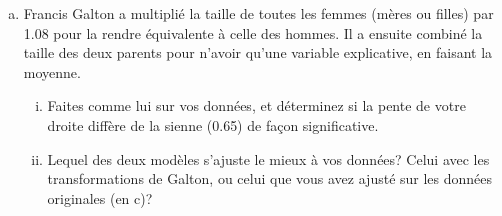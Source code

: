 \documentclass[letter, 11pt]{article}
\begin{document}
\begin{enumerate}[(a)]
\item Francis Galton a multiplié la taille de toutes les femmes (mères ou filles) par 1.08 pour la rendre équivalente à celle des hommes. Il a ensuite combiné la taille des deux parents pour n'avoir qu'une variable explicative, en faisant la moyenne. 
    \begin{enumerate}[(i)]
    \item  Faites comme lui sur vos données, et déterminez si la pente de votre droite diffère de la sienne (0.65) de façon significative.
    \item Lequel des deux modèles s'ajuste le mieux à vos données? Celui avec les transformations de Galton, ou celui que vous avez ajusté sur les données originales (en c)?
    \end{enumerate}

\end{enumerate}


\end{document}

